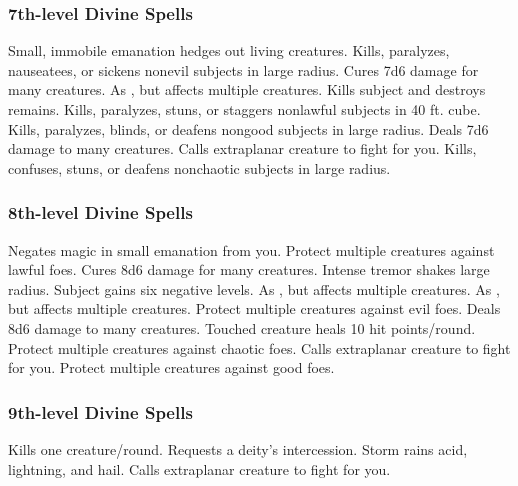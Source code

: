 \subsubsection{7th-level Divine Spells}
\begin{spelllist}
   Small, immobile emanation hedges out living creatures.
   Kills, paralyzes, nauseatees, or sickens nonevil subjects in large radius.
   Cures 7d6 damage for many creatures.
   As , but affects multiple creatures.
  \F Kills subject and destroys remains.
   Kills, paralyzes, stuns, or staggers nonlawful subjects in 40 ft. cube.
   Kills, paralyzes, blinds, or deafens nongood subjects in large radius.
   Deals 7d6 damage to many creatures.
   Calls extraplanar creature to fight for you.
   Kills, confuses, stuns, or deafens nonchaotic subjects in large radius.
\end{spelllist}

\subsubsection{8th-level Divine Spells}
\begin{spelllist}
   Negates magic in small emanation from you.
  \F Protect multiple creatures against lawful foes. 
   Cures 8d6 damage for many creatures.
   Intense tremor shakes large radius.
   Subject gains six negative levels.
   As , but affects multiple creatures.
   As , but affects multiple creatures.
  \F Protect multiple creatures against evil foes. 
   Deals 8d6 damage to many creatures.
   Touched creature heals 10 hit points/round.
  \F Protect multiple creatures against chaotic foes. 
   Calls extraplanar creature to fight for you.
  \F Protect multiple creatures against good foes. 
\end{spelllist}

\subsubsection{9th-level Divine Spells}
\begin{spelllist}
   Kills one creature/round.
  \M Requests a deity's intercession.
   Storm rains acid, lightning, and hail.
   Calls extraplanar creature to fight for you.
\end{spelllist}

